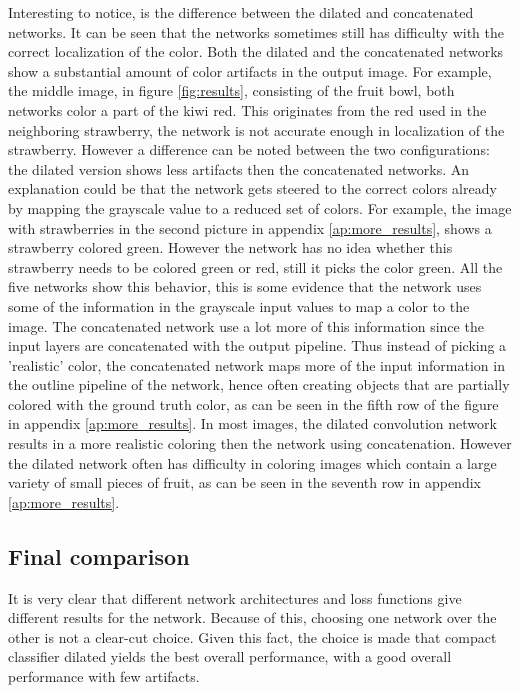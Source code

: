 Interesting to notice, is the difference between the dilated and concatenated networks. It can be seen that the networks sometimes still has difficulty with the correct localization of the color. Both the dilated and the concatenated networks show a substantial amount of color artifacts in the output image. For example, the middle image, in figure \ref{fig:results}, consisting of the fruit bowl, both networks color a part of the kiwi red. This originates from the red used in the neighboring strawberry, the network is not accurate enough in localization of the strawberry. However a difference can be noted between the two configurations: the dilated version shows less artifacts then the concatenated networks. An explanation could be that the network gets steered to the correct colors already by mapping the grayscale value to a reduced set of colors. For example, the image with strawberries in the second picture in appendix \ref{ap:more_results}, shows a strawberry colored green. However the network has no idea whether this strawberry needs to be colored green or red, still it picks the color green. All the five networks show this behavior, this is some evidence that the network uses some of the information in the grayscale input values to map a color to the image. The concatenated network use a lot more of this information since the input layers are concatenated with the output pipeline. Thus instead of picking a 'realistic' color, the concatenated network maps more of the input information in the outline pipeline of the network, hence often creating objects that are partially colored with the ground truth color, as can be seen in the fifth row of the figure in appendix \ref{ap:more_results}. In most images, the dilated convolution network results in a more realistic coloring then the network using concatenation. However the dilated network often has difficulty in coloring images which contain a large variety of small pieces of fruit, as can be seen in the seventh row in appendix \ref{ap:more_results}.

\subsection{Final comparison}
It is very clear that different network architectures and loss functions give different results for the network. Because of this, choosing one network over the other is not a clear-cut choice. Given this fact, the choice is made that compact classifier dilated yields the best overall performance, with a good overall performance with few artifacts.








